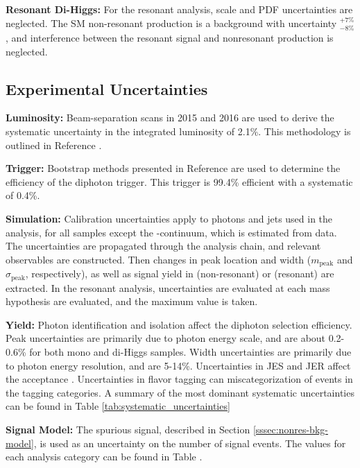 \noindent\textbf{Resonant Di-Higgs:} For the resonant analysis, scale and \gls{PDF} uncertainties are neglected. The \gls{SM} non-resonant \hh production is a background with uncertainty $^{+7\%}_{-8\%}$, and interference between the resonant \hh signal and nonresonant \hh production is neglected.

\subsection{Experimental Uncertainties} \label{ssec:exp-unc}

\noindent\textbf{Luminosity:} Beam-separation scans in 2015 and 2016 are used to derive the systematic uncertainty in the integrated luminosity of 2.1\%. This methodology is outlined in Reference \cite{lumi-unc}.

\noindent\textbf{Trigger:} Bootstrap methods presented in Reference \cite{trigger-unc} are used to determine the efficiency of the diphoton trigger. This trigger is 99.4\% efficient with a systematic of 0.4\%.

\noindent\textbf{Simulation:} Calibration uncertainties apply to photons and jets used in the analysis, for all samples except the \yy-continuum, which is estimated from data. The uncertainties are propagated through the analysis chain, and relevant observables are constructed. Then changes in peak location and width ($m_{\text{peak}}$ and $\sigma_{\text{peak}}$, respectively), as well as signal yield in \myy (non-resonant) or \myybb (resonant) are extracted. In the resonant analysis, uncertainties are evaluated at each mass hypothesis are evaluated, and the maximum value is taken.

\noindent\textbf{Yield:} Photon identification and isolation affect the diphoton selection efficiency. Peak uncertainties are primarily due to photon energy scale, and are about 0.2-0.6\% for both mono and di-Higgs samples. Width uncertainties are primarily due to photon energy resolution, and are 5-14\%. Uncertainties in \gls{JES} and \gls{JER} affect the \mbb acceptance \cite{jes-uncertainty}.  Uncertainties in flavor tagging can miscategorization of events in the tagging categories. A summary of the most dominant systematic uncertainties can be found in Table \ref{tab:systematic_uncertainties}

\noindent\textbf{Signal Model:} The spurious signal, described in Section \ref{sssec:nonres-bkg-model}, is used as an uncertainty on the number of signal events. The values for each analysis category can be found in Table \label{tab:unc-sig-events}.

